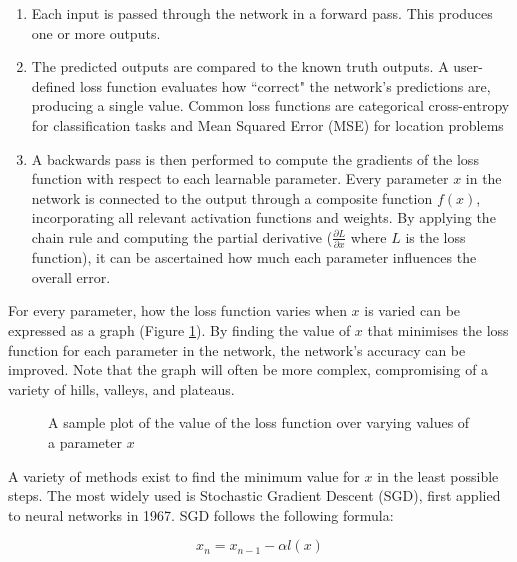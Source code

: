 \begin{enumerate}
    \item Each input is passed through the network in a forward pass. This produces one or more outputs.
    \item The predicted outputs are compared to the known truth outputs. A user-defined loss function evaluates how ``correct" the network's predictions are, producing a single value. Common loss functions are categorical cross-entropy for classification tasks and Mean Squared Error (MSE) for location problems\cite{begmann-backpropagation}
    \item A backwards pass is then performed to compute the gradients of the loss function with respect to each learnable parameter. Every parameter $x$ in the network is connected to the output through a composite function $f(x)$, incorporating all relevant activation functions and weights. By applying the chain rule and computing the partial derivative ($\frac{\partial L}{\partial x}$ where $L$ is the loss function), it can be ascertained how much each parameter influences the overall error.
\end{enumerate}

For every parameter, how the loss function varies when $x$ is varied can be expressed as a graph (Figure \ref{fig:loss-graph}). By finding the value of $x$ that minimises the loss function for each parameter in the network, the network's accuracy can be improved. Note that the graph will often be more complex, compromising of a variety of hills, valleys, and plateaus.

\begin{figure}[H]
    \centering
    \caption{A sample plot of the value of the loss function over varying values of a parameter $x$}
    \label{fig:loss-graph}
\end{figure}

A variety of methods exist to find the minimum value for $x$ in the least possible steps. The most widely used is Stochastic Gradient Descent (SGD)\cite{robbins1951stochastic}, first applied to neural networks in 1967\cite{shunichi1967theory}. SGD follows the following formula:

\begin{equation}
    x_n=x_{n-1}-\alpha l(x)
\end{equation}

